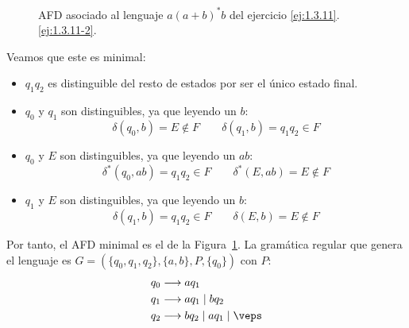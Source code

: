 \begin{ejercicio}
\begin{enumerate}
\begin{figure}
            \caption{AFD asociado al lenguaje $a{(a+b)}^{\ast}b$ del ejercicio \ref{ej:1.3.11}.\ref{ej:1.3.11-2}.}
            \label{fig:1.3.11-2-AFD}
        \end{figure}

        Veamos que este es minimal:
        \begin{itemize}
            \item $q_1q_2$ es distinguible del resto de estados por ser el único estado final.
            \item $q_0$ y $q_1$ son distinguibles, ya que leyendo un $b$:
            \begin{equation*}
                \delta(q_0,b)=E\notin F\qquad \delta(q_1,b)=q_1q_2\in F
            \end{equation*}

            \item $q_0$ y $E$ son distinguibles, ya que leyendo un $ab$:
            \begin{equation*}
                \delta^*(q_0,ab)=q_1q_2\in F\qquad \delta^*(E,ab)=E\notin F
            \end{equation*}

            \item $q_1$ y $E$ son distinguibles, ya que leyendo un $b$:
            \begin{equation*}
                \delta(q_1,b)=q_1q_2\in F\qquad \delta(E,b)=E\notin F
            \end{equation*}
        \end{itemize}

        Por tanto, el AFD minimal es el de la Figura~\ref{fig:1.3.11-2-AFD}. La gramática regular que genera el lenguaje es $G=(\{q_0,q_1,q_2\},\{a,b\},P,\{q_0\})$ con $P$:
        \begin{align*}
            q_0 &\longrightarrow aq_1\\
            q_1 &\longrightarrow aq_1\mid bq_2\\
            q_2 &\longrightarrow bq_2\mid aq_1\mid \veps
        \end{align*}
    \end{enumerate}
\end{ejercicio}

